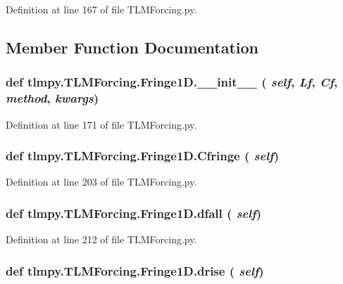 Definition at line 167 of file TLMForcing.py.

\subsection{Member Function Documentation}
\hypertarget{classtlmpy_1_1TLMForcing_1_1Fringe1D_ae20b94fe7734a51f0f0cc426e4f11ace}{
\subsubsection[{\_\-\_\-init\_\-\_\-}]{\setlength{\rightskip}{0pt plus 5cm}def tlmpy.TLMForcing.Fringe1D.\_\-\_\-init\_\-\_\- ( {\em self}, \/   {\em Lf}, \/   {\em Cf}, \/   {\em method}, \/   {\em kwargs})}}
\label{classtlmpy_1_1TLMForcing_1_1Fringe1D_ae20b94fe7734a51f0f0cc426e4f11ace}


Definition at line 171 of file TLMForcing.py.\hypertarget{classtlmpy_1_1TLMForcing_1_1Fringe1D_a805f421e396801313108d97ddb9966e1}{
\subsubsection[{Cfringe}]{\setlength{\rightskip}{0pt plus 5cm}def tlmpy.TLMForcing.Fringe1D.Cfringe ( {\em self})}}
\label{classtlmpy_1_1TLMForcing_1_1Fringe1D_a805f421e396801313108d97ddb9966e1}


Definition at line 203 of file TLMForcing.py.\hypertarget{classtlmpy_1_1TLMForcing_1_1Fringe1D_a8492efa38c4a195f9b80e8ecc3c32a81}{
\subsubsection[{dfall}]{\setlength{\rightskip}{0pt plus 5cm}def tlmpy.TLMForcing.Fringe1D.dfall ( {\em self})}}
\label{classtlmpy_1_1TLMForcing_1_1Fringe1D_a8492efa38c4a195f9b80e8ecc3c32a81}


Definition at line 212 of file TLMForcing.py.\hypertarget{classtlmpy_1_1TLMForcing_1_1Fringe1D_a861b9384e47d8828771f04c415edf551}{
\subsubsection[{drise}]{\setlength{\rightskip}{0pt plus 5cm}def tlmpy.TLMForcing.Fringe1D.drise ( {\em self})}}
\label{classtlmpy_1_1TLMForcing_1_1Fringe1D_a861b9384e47d8828771f04c415edf551}


